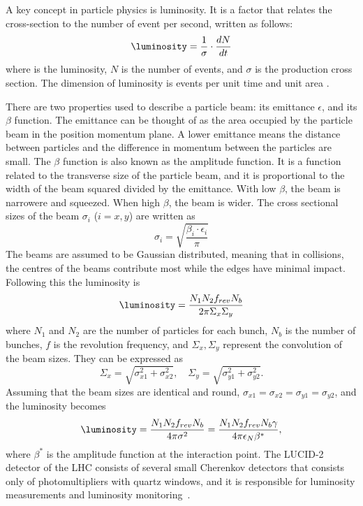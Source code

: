 A key concept in particle physics is luminosity. It is a factor that relates the cross-section to the number of event per second, written as follows:
\begin{equation}
    \luminosity=\dfrac{1}{\sigma}\cdot\dfrac{dN}{dt}
\end{equation}
where \luminosity is the luminosity, $N$ is the number of events, and $\sigma$ is the production cross section. The dimension of luminosity is events per unit time and unit area \unit{}{\cm\rpsquared}\unit{}{\second\rp}.

There are two properties used to describe a particle beam: its  emittance $\epsilon$, and its $\beta$ function. The emittance can be thought of as the area occupied by the particle beam in the position momentum plane. A lower emittance means the distance between particles and the difference in momentum between the particles are small. The $\beta$ function is also known as the amplitude function. It is a function related to the transverse size of the particle beam, and it is proportional to the width of the beam squared divided by the emittance. With low $\beta$, the beam is narrowere and squeezed. When high $\beta$, the beam is wider. The cross sectional sizes of the beam $\sigma_i$ ($i=x,y$) are written as 
\begin{equation}
    \sigma_i=\sqrt{\dfrac{\beta_i\cdot\epsilon_i}{\pi}}
\end{equation}
The beams are assumed to be Gaussian distributed, meaning that in collisions, the centres of the beams contribute most while the edges have minimal impact. Following this the luminosity is
\begin{equation}
    \luminosity=\dfrac{N_1N_2f_{rev}N_b}{2\pi\Sigma_x\Sigma_y}
\end{equation}
where $N_1$ and $N_2$ are the number of particles for each bunch, $N_b$ is the number of bunches, $f$ is the revolution frequency, and $\Sigma_x,\Sigma_y$ represent the  convolution of the beam sizes. They can be expressed as
\begin{equation}
    \Sigma_x=\sqrt{\sigma_{x1}^2+\sigma_{x2}^2}, \quad \Sigma_y=\sqrt{\sigma_{y1}^2+\sigma_{y2}^2}.
\end{equation}
Assuming that the beam sizes are identical and round, $\sigma_{x1}=\sigma_{x2}=\sigma_{y1}=\sigma_{y2}$, and the luminosity becomes
\begin{equation}
    \luminosity=\dfrac{N_1N_2f_{rev}N_b}{4\pi\sigma^2}=\dfrac{N_1N_2f_{rev}N_b\gamma}{4\pi\epsilon_N\beta^*},
\end{equation}
where $\beta^*$ is the amplitude function at the interaction point. The LUCID-2 detector of the LHC consists of several small Cherenkov detectors that consists only of photomultipliers with quartz windows, and it is responsible for luminosity measurements and luminosity monitoring~\cite{Avoni:2633501}. 

